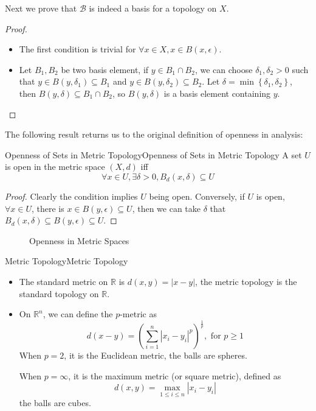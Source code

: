 \documentclass[../main.tex]{subfiles}
\begin{document}
Next we prove that $\mathcal{B}$ is indeed a basis for a topology on $X$.
\begin{proof}
\begin{itemize}
\item The first condition is trivial for $\forall x\in X, x\in B(x, \epsilon)$.
\item Let $B_1,B_2$ be two basis element, if $y\in B_1\cap B_2$, we can choose $\delta_1,\delta_2>0$ such that $y\in B(y,\delta_1) \subseteq B_1$ and $y\in B(y,\delta_2) \subseteq B_2$. Let $\delta = \min\left\{ \delta_1, \delta_2 \right\}$, then $B(y,\delta) \subseteq B_1\cap B_2$, so $B(y,\delta)$ is a basis element containing $y$.
\end{itemize}
\end{proof}

The following result returns us to the original definition of openness in analysis:
\begin{proposition}{Openness of Sets in Metric Topology}{Openness of Sets in Metric Topology}
A set $U$ is open in the metric space $(X,d)$ iff
\begin{equation}
\forall x\in U,\exists \delta>0, B_d(x,\delta) \subseteq U
\end{equation}
\end{proposition}
\begin{proof}
Clearly the condition implies $U$ being open. Conversely, if $U$ is open, $\forall x\in U$, there is $x\in B(y,\epsilon) \subseteq U$, then we can take $\delta$ that $B_d(x,\delta) \subseteq B(y,\epsilon) \subseteq U$.
\end{proof}

\begin{figure}[ht]
    \centering
    \caption{Openness in Metric Spaces}
    \label{fig:openness-in-metric-spaces}
\end{figure}

\begin{example}{Metric Topology}{Metric Topology}
\begin{itemize}
\item The standard metric on $\mathbb{R}$ is $d(x,y) = |x-y|$, the metric topology is the standard topology on $\mathbb{R}$.
\item On $\mathbb{R}^n$, we can define the $p$-metric as
	\begin{equation*}
		d(x-y) = \left( \sum_{i=1}^{n} |x_i - y_i|^p \right)^{\frac{1}{p}}, \text{ for } p\geq 1
	\end{equation*}
	When $p=2$, it is the Euclidean metric, the balls are spheres.

	When $p=\infty$, it is the maximum metric (or square metric), defined as
	\begin{equation*}
		d(x,y) = \max_{1\leq i \leq n} |x_i - y_i|
	\end{equation*}
	the balls are cubes.
\end{itemize}
\end{example}
\end{document}
